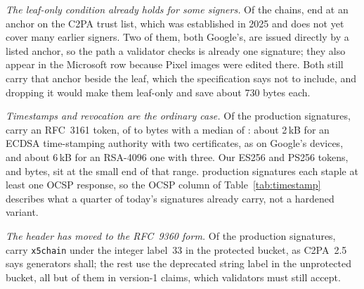 \emph{The leaf-only condition already holds for some signers.}
Of the \NcorpProdChains{} chains, \NcorpProdListed{} end at an anchor on the
C2PA trust list, which was established in 2025 and does not yet cover many
earlier signers. Two of them, both Google's, are issued directly by a listed
anchor, so the path a validator checks is already one signature; they also
appear in the Microsoft row because Pixel images were edited there. Both still
carry that anchor beside the leaf, which the specification says not to
include, and dropping it would make them leaf-only and save about 730 bytes
each.

\emph{Timestamps and revocation are the ordinary case.} Of the
\NcorpProdSigs{} production signatures, \NcorpProdTs{} carry an RFC~3161 token, of
\NcorpProdTstLo{} to \NcorpProdTstHi{} bytes with a median of
\NcorpProdTstMed{}: about 2\,kB for an ECDSA time-stamping authority with two
certificates, as on Google's devices, and about 6\,kB for an RSA-4096 one with
three. Our ES256 and PS256 tokens, \NtokenBytesES{} and \NtokenBytesPS{}
bytes, sit at the small end of that range. \NcorpProdOcsp{} production
signatures each staple at least one OCSP response, so the OCSP column of
Table~\ref{tab:timestamp} describes what a quarter of today's signatures
already carry, not a hardened variant.

\emph{The header has moved to the RFC~9360 form.} Of the
\NcorpProdNxfive{} production signatures, \NcorpProdPthree{} carry \texttt{x5chain} under the
integer label~33 in the protected bucket, as C2PA~2.5 says generators shall;
the rest use the deprecated string label in the unprotected bucket, all but
\NcorpProdVtwoString{} of them in version-1 claims, which validators must
still accept.

